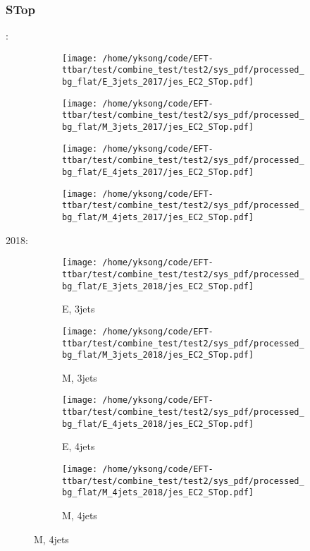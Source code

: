 \documentclass{beamer}
\begin{document}
\begin{frame}
\frametitle{STop}
\fontsize{5}{1}:
\begin{figure}
\centering
\begin{subfigure}[b]{0.24\textwidth}
\texttt{[image: /home/yksong/code/EFT-ttbar/test/combine\_test/test2/sys\_pdf/processed\_bg\_flat/E\_3jets\_2017/jes\_EC2\_STop.pdf]}
\end{subfigure}
\begin{subfigure}[b]{0.24\textwidth}
\texttt{[image: /home/yksong/code/EFT-ttbar/test/combine\_test/test2/sys\_pdf/processed\_bg\_flat/M\_3jets\_2017/jes\_EC2\_STop.pdf]}
\end{subfigure}
\begin{subfigure}[b]{0.24\textwidth}
\texttt{[image: /home/yksong/code/EFT-ttbar/test/combine\_test/test2/sys\_pdf/processed\_bg\_flat/E\_4jets\_2017/jes\_EC2\_STop.pdf]}
\end{subfigure}
\begin{subfigure}[b]{0.24\textwidth}
\texttt{[image: /home/yksong/code/EFT-ttbar/test/combine\_test/test2/sys\_pdf/processed\_bg\_flat/M\_4jets\_2017/jes\_EC2\_STop.pdf]}
\end{subfigure}
\end{figure}
2018:
\begin{figure}
\centering
\begin{subfigure}[b]{0.24\textwidth}
\texttt{[image: /home/yksong/code/EFT-ttbar/test/combine\_test/test2/sys\_pdf/processed\_bg\_flat/E\_3jets\_2018/jes\_EC2\_STop.pdf]}
\captionsetup{font=tiny}
\caption{E, 3jets}
\end{subfigure}
\begin{subfigure}[b]{0.24\textwidth}
\texttt{[image: /home/yksong/code/EFT-ttbar/test/combine\_test/test2/sys\_pdf/processed\_bg\_flat/M\_3jets\_2018/jes\_EC2\_STop.pdf]}
\captionsetup{font=tiny}
\caption{M, 3jets}
\end{subfigure}
\begin{subfigure}[b]{0.24\textwidth}
\texttt{[image: /home/yksong/code/EFT-ttbar/test/combine\_test/test2/sys\_pdf/processed\_bg\_flat/E\_4jets\_2018/jes\_EC2\_STop.pdf]}
\captionsetup{font=tiny}
\caption{E, 4jets}
\end{subfigure}
\begin{subfigure}[b]{0.24\textwidth}
\texttt{[image: /home/yksong/code/EFT-ttbar/test/combine\_test/test2/sys\_pdf/processed\_bg\_flat/M\_4jets\_2018/jes\_EC2\_STop.pdf]}
\captionsetup{font=tiny}
\caption{M, 4jets}
\end{subfigure}
\end{figure}
\end{frame}
\end{document}
